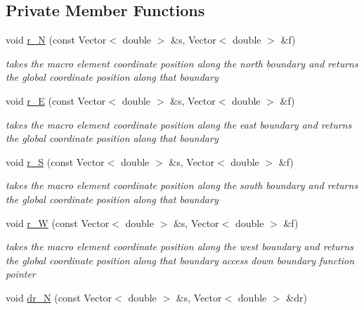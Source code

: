 \subsection*{Private Member Functions}
\begin{DoxyCompactItemize}
\item 
void \hyperlink{classoomph_1_1TopologicallyRectangularDomain_a6adb9d87f5dcedd2ede5a8da494930e5}{r\+\_\+N} (const Vector$<$ double $>$ \&s, Vector$<$ double $>$ \&f)
\begin{DoxyCompactList}\small\item\em takes the macro element coordinate position along the north boundary and returns the global coordinate position along that boundary \end{DoxyCompactList}\item 
void \hyperlink{classoomph_1_1TopologicallyRectangularDomain_a02ac630af43ddea871e5d9cf543d783b}{r\+\_\+E} (const Vector$<$ double $>$ \&s, Vector$<$ double $>$ \&f)
\begin{DoxyCompactList}\small\item\em takes the macro element coordinate position along the east boundary and returns the global coordinate position along that boundary \end{DoxyCompactList}\item 
void \hyperlink{classoomph_1_1TopologicallyRectangularDomain_a76ea308be7a90143fe728fc4799d584b}{r\+\_\+S} (const Vector$<$ double $>$ \&s, Vector$<$ double $>$ \&f)
\begin{DoxyCompactList}\small\item\em takes the macro element coordinate position along the south boundary and returns the global coordinate position along that boundary \end{DoxyCompactList}\item 
void \hyperlink{classoomph_1_1TopologicallyRectangularDomain_aa56f73a53b028997929605e71eab6e2d}{r\+\_\+W} (const Vector$<$ double $>$ \&s, Vector$<$ double $>$ \&f)
\begin{DoxyCompactList}\small\item\em takes the macro element coordinate position along the west boundary and returns the global coordinate position along that boundary access down boundary function pointer \end{DoxyCompactList}\item 
void \hyperlink{classoomph_1_1TopologicallyRectangularDomain_ad37cd9d2ee8eb90125d66be63d5b97c7}{dr\+\_\+N} (const Vector$<$ double $>$ \&s, Vector$<$ double $>$ \&dr)

\end{DoxyCompactItemize}
